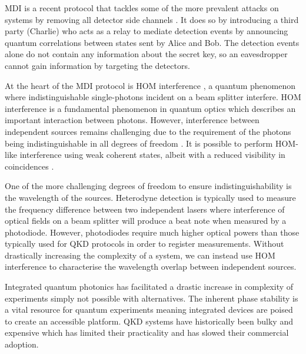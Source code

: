 \Ac{MDI} is a recent protocol that tackles some of the more prevalent attacks on systems by removing all detector side channels \cite{mdi-qkd}. It does so by introducing a third party (Charlie) who acts as a relay to mediate detection events by announcing quantum correlations between states sent by Alice and Bob. The detection events alone do not contain any information about the secret key, so an eavesdropper cannot gain information by targeting the detectors. 

At the heart of the \Ac{MDI} protocol is \ac{HOM} interference \cite{HOM}, a quantum phenomenon where indistinguishable single-photons incident on a beam splitter interfere. \ac{HOM} interference is a fundamental phenomenon in quantum optics which describes an important interaction between photons. However, interference between independent sources remains challenging due to the requirement of the photons being indistinguishable in all degrees of freedom \cite{Xu2013}. It is possible to perform \ac{HOM}-like interference using weak coherent states, albeit with a reduced visibility in coincidences \cite{Rarity2005}. 

One of the more challenging degrees of freedom to ensure indistinguishability is the wavelength of the sources. Heterodyne detection is typically used to measure the frequency difference between two independent lasers where interference of optical fields on a beam splitter will produce a beat note when measured by a photodiode. However, photodiodes require much higher optical powers than those typically used for QKD protocols in order to register measurements. Without drastically increasing the complexity of a system, we can instead use \ac{HOM} interference to characterise the wavelength overlap between independent sources.




Integrated quantum photonics has facilitated a drastic increase in complexity of experiments simply not possible with alternatives. The inherent phase stability is a vital resource for quantum experiments meaning integrated devices are poised to create an accessible platform. \Ac{QKD} systems have historically been bulky and expensive which has limited their practicality and has slowed their commercial adoption. 

